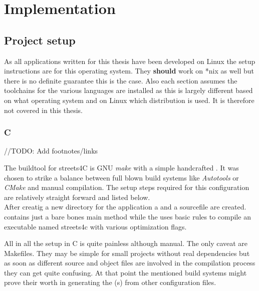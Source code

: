 \chapter{Implementation}
\label{ch:Implementation}


\setcounter{section}{-1}
\section{Project setup}
\label{sec:Implementation::Setup}

As all applications written for this thesis have been developed on Linux the setup instructions are for this operating system. They \textbf{should} work on *nix as well but there is no definite guarantee this is the case. Also each section assumes the toolchains for the various languages are installed as this is largely different based on what operating system and on Linux which distribution is used. It is therefore not covered in this thesis.

\subsection{C}
\label{subsec:Implementation::Setup::C}

//TODO: Add footnotes/links

The buildtool for streets4C is GNU \textit{make} with a simple handcrafted . It was chosen to strike a balance between full blown build systems like \textit{Autotools} or \textit{CMake} and manual compilation. The setup steps required for this configuration are relatively straight forward and listed below.
\\


After creatig a new directory for the application a  and a sourcefile are created.  contains just a bare bones main method while the  uses basic rules to compile an executable named streets4c with various optimization flags.

All in all the setup in C is quite painless although manual. The only caveat are Makefiles. They may be simple for small projects without real dependencies but as soon as different source and object files are involved in the compilation process they can get quite confusing. At that point the mentioned build systems might prove their worth in generating the (s) from other configuration files.


